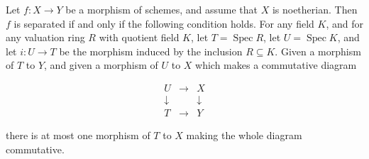 Let $f: X \to Y$ be a morphism of schemes, and assume that $X$ is noetherian. Then $f$ is separated if and only if the following condition holds. For any field $K$, and for any valuation ring $R$ with quotient field $K$, let $T = \operatorname{Spec} R$, let $U = \operatorname{Spec} K$, and let $i: U \to T$ be the morphism induced by the inclusion $R \subseteq K$. Given a morphism of $T$ to $Y$, and given a morphism of $U$ to $X$ which makes a commutative diagram

$$
\begin{array}{ccc}
U & \to & X \\
\downarrow & & \downarrow \\
T & \to & Y
\end{array}
$$

there is at most one morphism of $T$ to $X$ making the whole diagram commutative.
